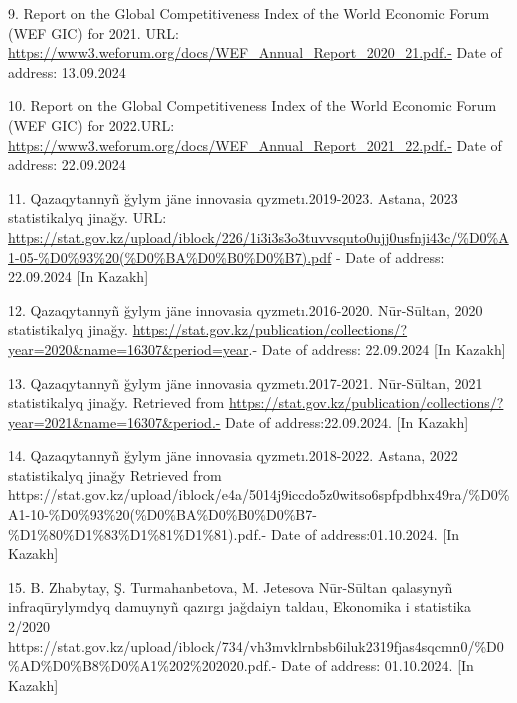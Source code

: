 \begin{references}
9. Report on the Global Competitiveness Index of the World Economic
Forum (WEF GIC) for 2021. URL:
\url{https://www3.weforum.org/docs/WEF_Annual_Report_2020_21.pdf.-} Date
of address: 13.09.2024

10. Report on the Global Competitiveness Index of the World Economic
Forum (WEF GIC) for 2022.URL:
\url{https://www3.weforum.org/docs/WEF_Annual_Report_2021_22.pdf.-} Date
of address: 22.09.2024

11. Qazaqytannyñ ğylym jäne innovasia qyzmetı.2019-2023. Astana, 2023
statistikalyq jinağy. URL:
\url{https://stat.gov.kz/upload/iblock/226/1i3i3s3o3tuvvsquto0ujj0usfnji43c/\%D0\%A1-05-\%D0\%93\%20(\%D0\%BA\%D0\%B0\%D0\%B7).pdf}
- Date of address: 22.09.2024 {[}In Kazakh{]}

12. Qazaqytannyñ ğylym jäne innovasia qyzmetı.2016-2020. Nūr-Sūltan,
2020 statistikalyq jinağy.
\url{https://stat.gov.kz/publication/collections/?year=2020&name=16307&period=year}.-
Date of address: 22.09.2024 {[}In Kazakh{]}

13. Qazaqytannyñ ğylym jäne innovasia qyzmetı.2017-2021. Nūr-Sūltan,
2021 statistikalyq jinağy. Retrieved from
\url{https://stat.gov.kz/publication/collections/?year=2021&name=16307&period.-}
Date of address:22.09.2024. {[}In Kazakh{]}

14. Qazaqytannyñ ğylym jäne innovasia qyzmetı.2018-2022. Astana, 2022
statistikalyq jinağy Retrieved from
https://stat.gov.kz/upload/iblock/e4a/5014j9iccdo5z0witso6spfpdbhx49ra/\%D0\%A1-10-\%D0\%93\%20(\%D0\%BA\%D0\%B0\%D0\%B7-\%D1\%80\%D1\%83\%D1\%81\%D1\%81).pdf.-
Date of address:01.10.2024. {[}In Kazakh{]}

15. B. Zhabytay, Ş. Turmahanbetova, M. Jetesova Nūr-Sūltan qalasynyñ
infraqūrylymdyq damuynyñ qazırgı jağdaiyn taldau, Ekonomika i statistika
2/2020
https://stat.gov.kz/upload/iblock/734/vh3mvklrnbsb6iluk2319fjas4sqcmn0/\%D0\%AD\%D0\%B8\%D0\%A1\%202\%202020.pdf.-
Date of address: 01.10.2024. {[}In Kazakh{]}
\end{references}

